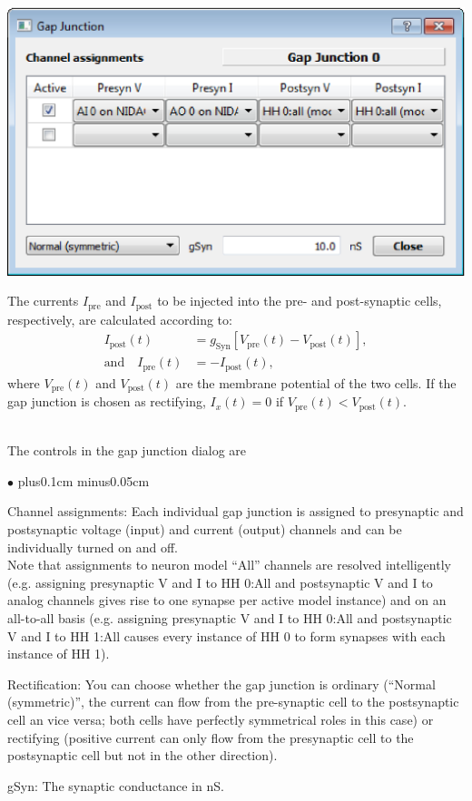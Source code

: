 \documentclass{article}
\newenvironment{myitem}{\begin{list}{$\bullet$}{\setlength{\leftmargin}{1.1em}
\itemsep0.1cm plus0.1cm minus0.05cm
\listparindent0cm
\addtolength{\labelsep}{0.5\labelsep}
\setlength{\labelwidth}{0.8em}
\setlength{\leftmargin}{\labelwidth}
\addtolength{\leftmargin}{\labelsep}
}}{\end{list}}
\begin{document}
\noindent
\parbox{0.4\textwidth}{
\includegraphics[scale=0.4]{gapJunctionDialog}
}
\hfill
\parbox{0.55\textwidth}{
The currents $I_{\text{pre}}$ and $I_{\text{post}}$ to be injected
into the pre- and post-synaptic cells, respectively, are calculated
according to:
\begin{align}
  I_{\text{post}}(t) &= g_{\text{Syn}} [V_{\text{pre}}(t) - V_{\text{post}}(t)],  \\
  \text{and} \quad I_{\text{pre}}(t) &= -I_{\text{post}}(t), 
\end{align}
where $V_{\text{pre}}(t)$ and $V_{\text{post}}(t)$ are the membrane
potential of the two cells. If the gap junction is chosen as
rectifying, $I_x (t)= 0$ if $V_{\text{pre}}(t) < V_{\text{post}}(t)$.
} \\[0.2cm]
The controls in the gap junction dialog are
\begin{myitem}
	\item Channel assignments: Each individual gap junction is assigned to presynaptic
	and postsynaptic voltage (input) and current (output) channels and can be individually
	turned on and off. \\
	Note that assignments to neuron model ``All'' channels are resolved intelligently
	(e.g. assigning presynaptic V and I to HH 0:All and postsynaptic V and I to analog channels
	gives rise to one synapse per active model instance)
	and on an all-to-all basis (e.g. assigning presynaptic V and I to HH 0:All and 
	postsynaptic V and I to HH 1:All causes every instance of HH 0 to form synapses with
	each instance of HH 1).
	\item Rectification: You can choose whether the gap junction is ordinary (``Normal (symmetric)'', the
	current can flow from the pre-synaptic cell to the postsynaptic cell
	an vice versa; both cells have perfectly symmetrical roles in this
	case) or rectifying (positive current can only flow from the presynaptic
	cell to the postsynaptic cell but not in the other direction).
	\item gSyn: The synaptic conductance in nS.
\end{myitem}
\end{document}

